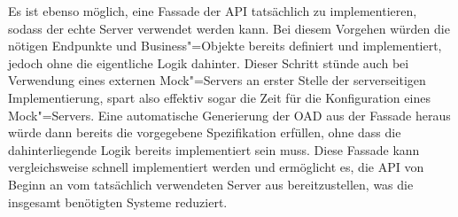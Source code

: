 Es ist ebenso möglich, eine Fassade der \ac{API} tatsächlich zu implementieren, sodass der echte Server verwendet werden kann.
Bei diesem Vorgehen würden die nötigen Endpunkte und Business"=Objekte bereits definiert und implementiert, jedoch ohne die eigentliche Logik dahinter. Dieser Schritt stünde auch bei Verwendung eines externen Mock"=Servers an erster Stelle der serverseitigen Implementierung, spart also effektiv sogar die Zeit für die Konfiguration eines Mock"=Servers.
Eine automatische Generierung der \ac{OAD} aus der Fassade heraus würde dann bereits die vorgegebene Spezifikation erfüllen, ohne dass die dahinterliegende Logik bereits implementiert sein muss.
Diese Fassade kann vergleichsweise schnell implementiert werden und ermöglicht es, die \ac{API} von Beginn an vom tatsächlich verwendeten Server aus bereitzustellen, was die insgesamt benötigten Systeme reduziert.